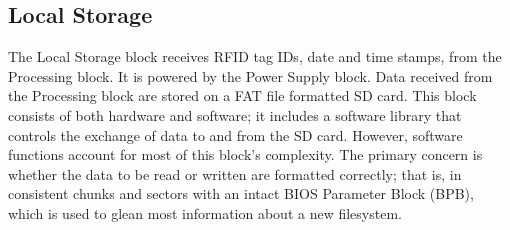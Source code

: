 

\subsection{Local Storage}
The Local Storage block receives RFID tag IDs, date and time stamps, from the Processing block. It is powered by the Power Supply block. Data received from the Processing block are stored on a FAT file formatted SD card. This block consists of both hardware and software; it includes a software library that controls the exchange of data to and from the SD card. However, software functions account for most of this block's complexity. The primary concern is whether the data to be read or written are formatted correctly; that is, in consistent chunks and sectors with an intact BIOS Parameter Block (BPB), which is used to glean most information about a new filesystem.


% 